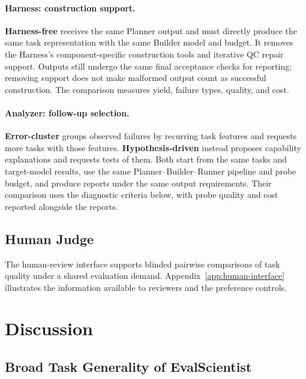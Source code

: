 \documentclass{article} %
\begin{document}
	\paragraph{Harness: construction support.}
	\textbf{Harness-free} receives the same Planner output and must directly produce
	the same task representation with the same Builder model and budget. It removes
	the Harness's component-specific construction tools and iterative QC repair
	support. Outputs still undergo the same final acceptance checks for reporting;
	removing support does not make malformed output count as successful construction.
	The comparison measures yield, failure types, quality, and cost.
	
	\paragraph{Analyzer: follow-up selection.}
	\textbf{Error-cluster} groups observed failures by recurring task features and
	requests more tasks with those features. \textbf{Hypothesis-driven} instead
	proposes capability explanations and requests tests of them. Both start from
	the same tasks and target-model results, use the same Planner--Builder--Runner
	pipeline and probe budget, and produce reports under the same output
	requirements. Their comparison uses the diagnostic criteria below, with probe
	quality and cost reported alongside the reports.
	
	\subsection{Human Judge}
	The human-review interface supports blinded pairwise comparisons of task quality
	under a shared evaluation demand. Appendix~\ref{app:human-interface} illustrates
	the information available to reviewers and the preference controls.
	
	\section{Discussion}\label{sec:discussion}
	\subsection{Broad Task Generality of EvalScientist}\label{sec:task-generality}
\end{document}
